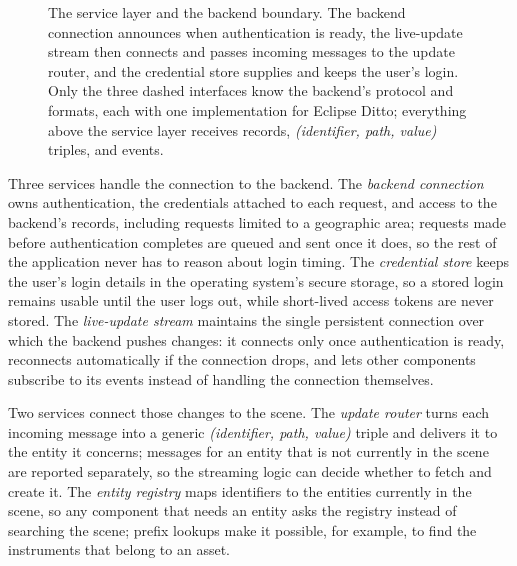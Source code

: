 \begin{figure}[t]
  \caption[The service layer and the backend boundary]{The service layer and the backend boundary. The backend connection announces when authentication is ready, the live-update stream then connects and passes incoming messages to the update router, and the credential store supplies and keeps the user's login. Only the three dashed interfaces know the backend's protocol and formats, each with one implementation for Eclipse Ditto; everything above the service layer receives records, \emph{(identifier, path, value)} triples, and events.}
  \label{fig:service-layer}
\end{figure}

Three services handle the connection to the backend. The \emph{backend connection} owns authentication, the credentials attached to each request, and access to the backend's records, including requests limited to a geographic area; requests made before authentication completes are queued and sent once it does, so the rest of the application never has to reason about login timing. The \emph{credential store} keeps the user's login details in the operating system's secure storage, so a stored login remains usable until the user logs out, while short-lived access tokens are never stored. The \emph{live-update stream} maintains the single persistent connection over which the backend pushes changes: it connects only once authentication is ready, reconnects automatically if the connection drops, and lets other components subscribe to its events instead of handling the connection themselves.

Two services connect those changes to the scene. The \emph{update router} turns each incoming message into a generic \emph{(identifier, path, value)} triple and delivers it to the entity it concerns; messages for an entity that is not currently in the scene are reported separately, so the streaming logic can decide whether to fetch and create it. The \emph{entity registry} maps identifiers to the entities currently in the scene, so any component that needs an entity asks the registry instead of searching the scene; prefix lookups make it possible, for example, to find the instruments that belong to an asset.

